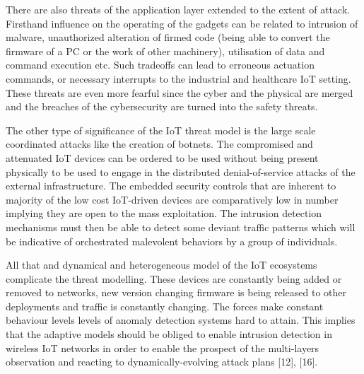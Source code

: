 \documentclass[12pt]{article}
\begin{document}
There are also threats of the application layer extended to the extent of attack. Firsthand influence on the operating of the gadgets can be related to intrusion of malware, unauthorized alteration of firmed code (being able to convert the firmware of a PC or the work of other machinery), utilisation of data and command execution etc. Such tradeoffs can lead to erroneous actuation commands, or necessary interrupts to the industrial and healthcare IoT setting. These threats are even more fearful since the cyber and the physical are merged and the breaches of the cybersecurity are turned into the safety threats.















The other type of significance of the IoT threat model is the large scale coordinated attacks like the creation of botnets. The compromised and attenuated IoT devices can be ordered to be used without being present physically to be used to engage in the distributed denial-of-service attacks of the external infrastructure. The embedded security controls that are inherent to majority of the low cost IoT-driven devices are comparatively low in number implying they are open to the mass exploitation. The intrusion detection mechanisms must then be able to detect some deviant traffic patterns which will be indicative of orchestrated malevolent behaviors by a group of individuals.















All that and dynamical and heterogeneous model of the IoT ecosystems complicate the threat modelling. These devices are constantly being added or removed to networks, new version changing firmware is being released to other deployments and traffic is constantly changing. The forces make constant behaviour levels levels of anomaly detection systems hard to attain. This implies that the adaptive models should be obliged to enable intrusion detection in wireless IoT networks in order to enable the prospect of the multi-layers observation and reacting to dynamically-evolving attack plans [12], [16].
\end{document}
